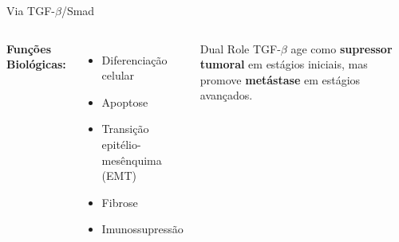 \begin{frame}{Via TGF-$\beta$/Smad}
\begin{columns}
\vspace{0.3cm}

\textbf{Funções Biológicas:}
\begin{itemize}
    \item Diferenciação celular
    \item Apoptose
    \item Transição epitélio-mesênquima (EMT)
    \item Fibrose
    \item Imunossupressão
\end{itemize}

\vspace{0.3cm}

\begin{exampleblock}{Dual Role}
TGF-$\beta$ age como \textbf{supressor tumoral} em estágios iniciais, mas promove \textbf{metástase} em estágios avançados.
\end{exampleblock}
\end{columns}
\end{frame}

